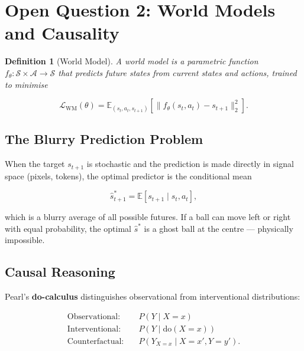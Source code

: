 \documentclass[10pt,twocolumn]{article}
\newtheorem{definition}{Definition}
\begin{document}
\section{Open Question 2: World Models and Causality}
\label{sec:worldmodels}

\begin{definition}[World Model]
A world model is a parametric function $f_\theta : \mathcal{S} \times
\mathcal{A} \to \mathcal{S}$ that predicts future states from current
states and actions, trained to minimise

\begin{equation}
  \mathcal{L}_{\text{WM}}(\theta) = \mathbb{E}_{(s_t, a_t, s_{t+1})}
  \!\left[\|f_\theta(s_t, a_t) - s_{t+1}\|_2^2\right].
  \label{eq:wm}
\end{equation}
\end{definition}

\subsection{The Blurry Prediction Problem}

When the target $s_{t+1}$ is stochastic and the prediction is made
directly in signal space (pixels, tokens), the optimal predictor is
the conditional mean

\begin{equation}
  \hat{s}_{t+1}^* = \mathbb{E}[s_{t+1} \mid s_t, a_t],
  \label{eq:cond_mean}
\end{equation}

\noindent which is a blurry average of all possible futures.  If a ball
can move left or right with equal probability, the optimal
$\hat{s}^*$ is a ghost ball at the centre — physically impossible.

\subsection{Causal Reasoning}

Pearl's \citeyear{pearl2009causality} \textbf{do-calculus} distinguishes
observational from interventional distributions:

\begin{align}
  \text{Observational:} &\quad P(Y \mid X = x) \label{eq:obs}\\
  \text{Interventional:} &\quad P(Y \mid \text{do}(X = x)) \label{eq:int}\\
  \text{Counterfactual:} &\quad P(Y_{X=x} \mid X = x', Y = y'). \label{eq:counter}
\end{align}
\end{document}
